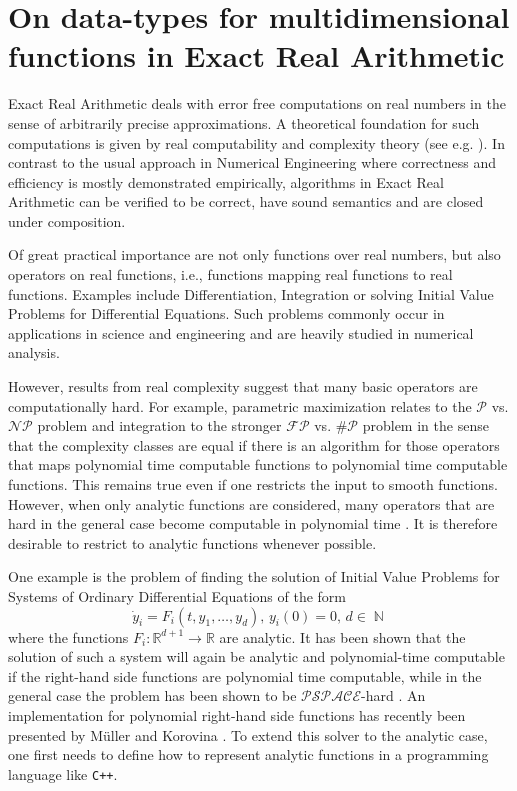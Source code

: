 \documentclass{article}
\newcommand{\RR}{\mathbb R}
\DeclareMathOperator{\NN}{\mathbb N}
\newcommand{\p}{\ensuremath{\mathcal P}\xspace}
\newcommand{\np}{\ensuremath{\mathcal{NP}}\xspace}
\newcommand{\fp}{\ensuremath{\mathcal{FP}}\xspace}
\newcommand{\sharpp}{\ensuremath{\# \mathcal{P}}\xspace}
\newcommand{\pspace}{\ensuremath{ \mathcal{PSPACE}}\xspace}
\newcommand{\cc}{\texttt{C++}\xspace}
\begin{document}
\section*{On data-types for multidimensional functions in Exact Real Arithmetic}
Exact Real Arithmetic deals with error free computations on real numbers in the sense of arbitrarily precise approximations. 
A theoretical foundation for such computations is given by real computability and complexity theory (see e.g. \cite{MR0089809, MR1137517,Weihrauch}).
In contrast to the usual approach in Numerical Engineering where correctness and efficiency is mostly demonstrated empirically, algorithms in Exact Real Arithmetic can be verified to be correct, have sound semantics and are closed under composition.


Of great practical importance are not only functions over real numbers, but also operators on real functions, i.e., functions mapping real functions to real functions.
Examples include Differentiation, Integration or solving Initial Value Problems for Differential Equations.
Such problems commonly occur in applications in science and engineering and are heavily studied in numerical analysis.

However, results from real complexity suggest that many basic operators are computationally hard. 
For example, parametric maximization relates to the $\p$ vs. $\np$ problem \cite{MR666209} and integration to the stronger $\fp$ vs. $\sharpp$ problem \cite{MR748898} in the sense that the complexity classes are equal if there is an algorithm for those operators that maps polynomial time computable functions to polynomial time computable functions.
This remains true even if one restricts the input to smooth functions.
However, when only analytic functions are considered, many operators that are hard in the general case become computable in polynomial time \cite{Kawamura2012}.
It is therefore desirable to restrict to analytic functions whenever possible.

One example is the problem of finding the solution of Initial Value Problems for Systems of Ordinary Differential Equations of the form 
$$ \dot y_i = F_i(t, y_1, \dots, y_d),\,y_i(0)=0,\, d \in \NN$$
where the functions $F_i : \RR^{d+1} \to \RR$ are analytic.
It has been shown that the solution of such a system will again be analytic and polynomial-time computable if the right-hand side functions are polynomial time computable, while in the general case the problem has been shown to be \pspace-hard \cite{Kawamura10}.
An implementation for polynomial right-hand side functions has recently been presented by M\"{u}ller and Korovina \cite{DBLP:journals/corr/abs-1006-0401}.
To extend this solver to the analytic case, one first needs to define how to represent analytic functions in a programming language like \cc.
\end{document}
